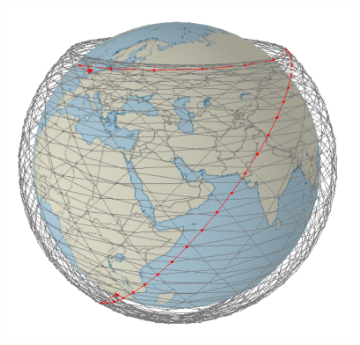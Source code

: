 \documentclass[12pt]{report}
\begin{document}
\begin{figure}
	\centering
	\caption{Screenshots of my program simulating the shortest path between two nodes through different linking methods and rates of satellite failure, the highlighted path is the shortest path between the two base stations.}
	\label{fig:Screenshots}
	\begin{subfigure}[b]{\textwidth}
		\includegraphics[width=\textwidth]{LDN-JHB-H0-1}
	\end{subfigure}
	

\end{figure}
\end{document}
